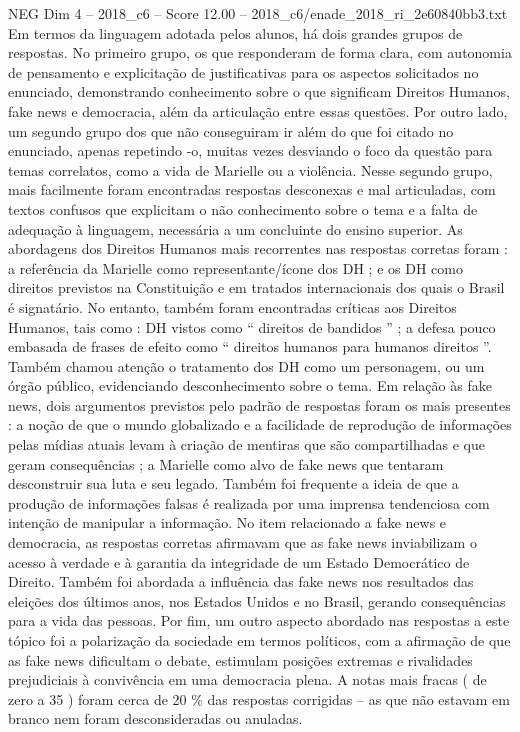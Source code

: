 \begin{textsample}{NEG Dim 4 – 2018\_c6 – Score 12.00 – 2018\_c6/enade\_2018\_ri\_2e60840bb3.txt}
Em termos da linguagem adotada pelos alunos, há dois grandes grupos de respostas.
No primeiro grupo, os que responderam de forma clara, com autonomia de pensamento e explicitação de justificativas para os aspectos solicitados no enunciado, demonstrando conhecimento sobre o que significam Direitos Humanos, fake news e democracia, além da articulação entre essas questões.
Por outro lado, um segundo grupo dos que não conseguiram ir além do que foi citado no enunciado, apenas repetindo -o, muitas vezes desviando o foco da questão para temas correlatos, como a vida de Marielle ou a violência.
Nesse segundo grupo, mais facilmente foram encontradas respostas desconexas e mal articuladas, com textos confusos que explicitam o não conhecimento sobre o tema e a falta de adequação à linguagem, necessária a um concluinte do ensino superior.
As abordagens dos Direitos Humanos mais recorrentes nas respostas corretas foram : a referência da Marielle como representante/ícone dos DH ; e os DH como direitos previstos na Constituição e em tratados internacionais dos quais o Brasil é signatário.
No entanto, também foram encontradas críticas aos Direitos Humanos, tais como : DH vistos como “ direitos de bandidos ” ; a defesa pouco embasada de frases de efeito como “ direitos humanos para humanos direitos ”.
Também chamou atenção o tratamento dos DH como um personagem, ou um órgão público, evidenciando desconhecimento sobre o tema.
Em relação às fake news, dois argumentos previstos pelo padrão de respostas foram os mais presentes : a noção de que o mundo globalizado e a facilidade de reprodução de informações pelas mídias atuais levam à criação de mentiras que são compartilhadas e que geram consequências ; a Marielle como alvo de fake news que tentaram desconstruir sua luta e seu legado.
Também foi frequente a ideia de que a produção de informações falsas é realizada por uma imprensa tendenciosa com intenção de manipular a informação.
No item relacionado a fake news e democracia, as respostas corretas afirmavam que as fake news inviabilizam o acesso à verdade e à garantia da integridade de um Estado Democrático de Direito.
Também foi abordada a influência das fake news nos resultados das eleições dos últimos anos, nos Estados Unidos e no Brasil, gerando consequências para a vida das pessoas.
Por fim, um outro aspecto abordado nas respostas a este tópico foi a polarização da sociedade em termos políticos, com a afirmação de que as fake news dificultam o debate, estimulam posições extremas e rivalidades prejudiciais à convivência em uma democracia plena.
A notas mais fracas ( de zero a 35 ) foram cerca de 20 \% das respostas corrigidas – as que não estavam em branco nem foram desconsideradas ou anuladas.

\end{textsample}
